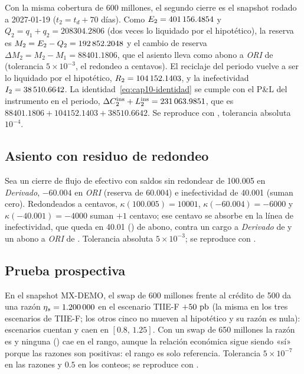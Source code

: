 Con la misma cobertura de 600 millones, el segundo cierre es el snapshot rodado a 2027-01-19 ($t_2=t_d+70$ días). Como
$E_2 = \verif{cap10-efectiva-2}{401156.4854}$ y $Q_2 = q_1+q_2 = 208304.2806$ (dos veces lo liquidado por el hipotético),
la reserva es
$M_2=E_2-Q_2=\verif{cap10-reserva-2}{192852.2048}$ y el cambio de reserva $\Delta M_2 = M_2-M_1 = 88401.1806$, que el
asiento lleva como abono a \emph{ORI} de  (tolerancia $5\times10^{-3}$, el
redondeo a centavos). El reciclaje del periodo vuelve a ser lo liquidado por el hipotético,
$R_2=\verif{cap10-reciclaje-2}{104152.1403}$, y la inefectividad $I_2=\verif{cap10-inefectividad-2}{38510.6642}$. La
identidad~\eqref{eq:cap10-identidad} se cumple con el P\&L del instrumento en el periodo,
$\Delta C^{\mathrm{ins}}_2+L^{\mathrm{ins}}_2=\verif{cap10-pnl-instrumento-2}{231063.9851}$, que es
$88401.1806 + 104152.1403 + 38510.6642$. Se reproduce con
, tolerancia absoluta $10^{-4}$.

\subsection{Asiento con residuo de redondeo}

Sea un cierre de flujo de efectivo con saldos sin redondear de 100.005 en \emph{Derivado}, $-60.004$ en \emph{ORI}
(reserva de 60.004) e inefectividad de 40.001 (suman cero). Redondeados a centavos, $\kappa(100.005)=10001$,
$\kappa(-60.004)=-6000$ y $\kappa(-40.001)=-4000$ suman $+1$ centavo; ese centavo se absorbe en la línea de
inefectividad, que queda en 40.01 () de abono, contra un cargo a \emph{Derivado} de
 y un abono a \emph{ORI} de . Tolerancia absoluta
$5\times10^{-3}$; se reproduce con .

\subsection{Prueba prospectiva}

En el snapshot MX-DEMO, el swap de 600 millones frente al crédito de 500 da una razón $\eta_s=
\verif{cap10-razon-120}{1.200000}$ en el escenario TIIE-F $+50~\pb$ (la misma en los tres escenarios de TIIE-F; los otros
cinco no mueven al hipotético y su razón es nula):  escenarios cuentan y
 caen en $[0.8,\,1.25]$. Con un swap de 650 millones la razón es
 y ninguna () cae en el rango, aunque la relación
económica sigue siendo «sí» porque las razones son positivas: el rango es solo referencia. Tolerancia $5\times10^{-7}$
en las razones y $0.5$ en los conteos; se reproduce con
.

